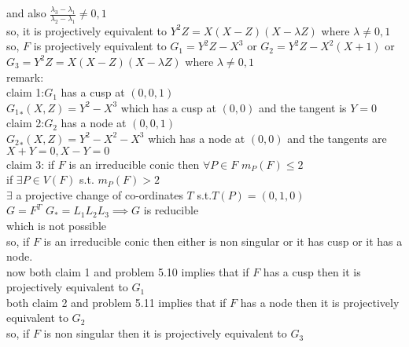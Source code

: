 \documentclass[11pt]{article}
\begin{document}
and also $\frac{\lambda_3-\lambda_1}{\lambda_2-\lambda_1}\neq 0,1$\\
so, it is projectively equivalent to $Y^2Z=X(X-Z)(X-\lambda Z)$ where $\lambda\neq 0, 1$\\
so, $F$ is projectively equivalent to $G_1=Y^2Z-X^3$ or $G_2=Y^2Z-X^2(X+1)$ or $G_3=Y^2Z=X(X-Z)(X-\lambda Z)$ where $\lambda\neq 0, 1$\\
remark:\\
claim 1:$G_1$ has a cusp at $(0,0,1)$\\
${G_1}_*(X,Z)=Y^2-X^3$ which has a cusp at $(0,0)$ and the tangent is $Y=0$\\
claim 2:$G_2$ has a node at $(0,0,1)$\\
${G_2}_*(X,Z)=Y^2-X^2-X^3$ which has a node at $(0,0)$ and the tangents are $X+Y=0,X-Y=0$\\
claim 3: if $F$ is an irreducible conic then $\forall P\in F$ $m_P(F)\leq 2$\\
if $\exists P\in V(F)$ s.t. $m_P(F)>2$\\
$\exists$   a projective change of co-ordinates $T$ s.t.$T(P)=(0,1,0)$ \\
$G=F^T$ $G_*=L_1L_2L_3\implies G$ is reducible\\
which is not possible\\
so, if $F$ is an irreducible conic then either is non singular or it has cusp or it has a node.\\
now both claim 1 and problem 5.10 implies that if $F$ has a cusp then it is projectively equivalent to $G_1$\\
both claim 2 and problem 5.11 implies that if $F$ has a node then it is projectively equivalent to $G_2$\\
so, if $F$ is non singular then it is projectively equivalent to $G_3$\\
\end{document}
